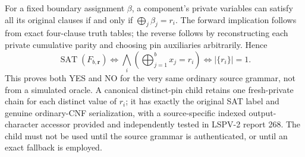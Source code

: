 \documentclass[11pt]{article}
\begin{document}
For a fixed boundary assignment $\beta$, a component's private variables can satisfy all its original clauses if and only if $\bigoplus_j\beta_j=r_i$. The forward implication follows from exact four-clause truth tables; the reverse follows by reconstructing each private cumulative parity and choosing pin auxiliaries arbitrarily. Hence
\[
\operatorname{SAT}(F_{b,\mathbf r})
\iff\bigwedge_i\left(\bigoplus_{j=1}^b x_j=r_i\right)
\iff\bigl|\{r_i\}\bigr|=1.
\tag{1}
\]
This proves both YES and NO for the very same ordinary source grammar, not from a simulated oracle. A canonical distinct-pin child retains one fresh-private chain for each distinct value of $r_i$; it has exactly the original SAT label and genuine ordinary-CNF serialization, with a source-specific indexed output-character accessor provided and independently tested in LSPV-2 report 268. The child must not be used until the source grammar is authenticated, or until an exact fallback is employed.
\end{document}
